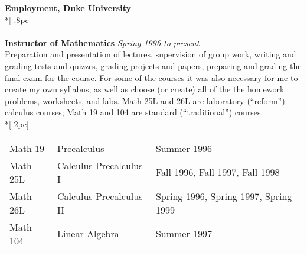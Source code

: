 {\large \bf Employment, Duke University} \\*[-.8pc]
\underline{\hspace{6in}} \\
\\
{\bf Instructor of Mathematics} \hfill {\it Spring 1996 to present\/} \\
Preparation and presentation of lectures, supervision of group work, 
writing and grading tests and quizzes, grading projects and papers, 
preparing and grading the final exam for the course. For some of the courses 
it was also necessary for me to create my own syllabus, 
as well as choose (or create) all of the the homework problems, worksheets, 
and labs. Math 25L and 26L are laboratory (``reform'') calculus courses; 
Math 19 and 104 are standard (``traditional'') courses. \\*[-2pc]

\begin{table}[h]
\begin{center}
\begin{tabular}{lll}
Math 19  & Precalculus             & Summer 1996 \\
Math 25L & Calculus-Precalculus I  & Fall 1996, Fall 1997, Fall 1998 \\
Math 26L & Calculus-Precalculus II & Spring 1996, Spring 1997, Spring 1999 \\
Math 104 & Linear Algebra          & Summer 1997 \\[-1pc]
\end{tabular}
\end{center}
\end{table}


